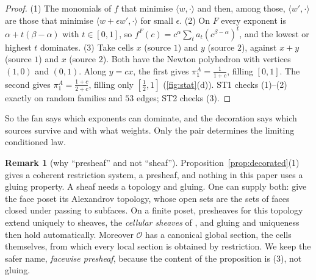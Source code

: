 \documentclass[11pt]{article}
\theoremstyle{definition}\newtheorem{definition}[theorem]{Definition}\newtheorem{remark}[theorem]{Remark}\newtheorem{example}[theorem]{Example}
\begin{document}
\begin{proof}
(1) The monomials of $f$ that minimise $\langle w,\cdot\rangle$ and then, among those, $\langle w',\cdot\rangle$ are those that minimise
$\langle w+\epsilon w',\cdot\rangle$ for small $\epsilon$. (2) On $F$ every exponent is $\alpha+t(\beta-\alpha)$ with $t\in[0,1]$, so $f^F(c)=c^\alpha\sum_ta_t(c^{\beta-\alpha})^t$, and
the lowest or highest $t$ dominates. (3) Take cells $x$ (source $1$) and $y$ (source $2$), against $x+y$ (source $1$) and $x$ (source $2$).
Both have the Newton polyhedron with vertices $(1,0)$ and $(0,1)$. Along $y=cx$, the first gives $\pi^A_1=\tfrac1{1+c}$, filling $[0,1]$. The
second gives $\pi^A_1=\tfrac{1+c}{2+c}$, filling only $[\tfrac12,1]$ (\cref{fig:stat}(d)). ST1 checks (1)--(2) exactly on random families and $53$
edges; ST2 checks (3).
\end{proof}

So the fan says which exponents can dominate, and the decoration says which sources survive and with what weights. Only the pair
determines the limiting conditioned law.

\begin{remark}[why ``presheaf'' and not ``sheaf'']
Proposition~\ref{prop:decorated}(1) gives a coherent restriction system, a presheaf, and nothing in this paper uses a gluing property. A
sheaf needs a topology and gluing. One can supply both: give the face poset its Alexandrov topology, whose open sets are the sets of faces
closed under passing to subfaces. On a finite poset, presheaves for this topology extend uniquely to sheaves, the \emph{cellular sheaves} of
\cite{Curry2014}, and gluing and uniqueness then hold automatically. Moreover $\mathcal O$ has a canonical global section, the cells themselves,
from which every local section is obtained by restriction. We keep the safer name, \emph{facewise presheaf}, because the content of the
proposition is (3), not gluing.
\end{remark}
\end{document}
